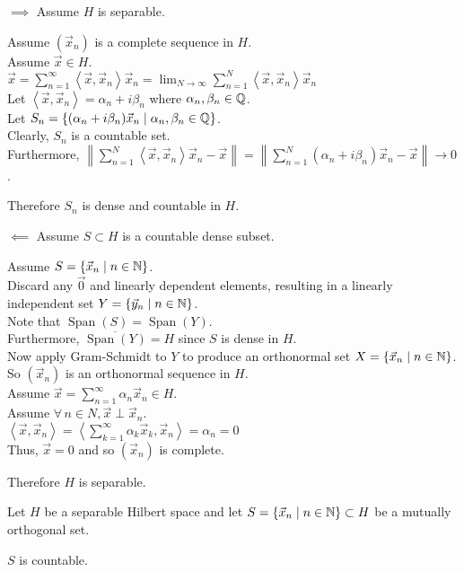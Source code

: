 \documentclass[letterpaper,12pt,fleqn]{article}
\newcommand{\vx}{\vec{x}}
\newcommand{\vy}{\vec{y}}
\newcommand{\vs}{\vec{x}}
\newcommand{\vo}{\vec{0}}
\newcommand{\norm}[1]{\left\|#1\right\|}
\newcommand{\inner}[1]{\left<#1\right>}
\renewcommand{\a}{\alpha}
\renewcommand{\b}{\beta}
\newcommand{\cl}[1]{\overline{#1}}
\DeclareMathOperator{\spn}{Span}
\begin{document}
\begin{theproof}
  \listbreak
  \begin{description}
  \item $\implies$ Assume $H$ is separable.

    Assume $(\vx_n)$ is a complete sequence in $H$. \\
    Assume $\vx\in H$. \\
    $\vx=\sum_{n=1}^{\infty}\inner{\vx,\vx_n}\vx_n=
    \lim_{N\to\infty}\sum_{n=1}^N\inner{\vx,\vx_n}\vx_n$ \\
    Let $\inner{\vx,\vx_n}=\a_n+i\b_n$ where $\a_n,\b_n\in\Q$. \\
    Let $S_n=\{(\a_n+i\b_n)\vx_n\mid\a_n,\b_n\in\Q\}$. \\
    Clearly, $S_n$ is a countable set. \\
    Furthermore, $\norm{\sum_{n=1}^N\inner{\vx,\vx_n}\vx_n-\vx}=
    \norm{\sum_{n=1}^N(\a_n+i\b_n)\vx_n-\vx}\to0$.

    Therefore $S_n$ is dense and countable in $H$.

  \item $\impliedby$ Assume $S\subset H$ is a countable dense subset.

    Assume $S=\{\vs_n\mid n\in\N\}$. \\
    Discard any $\vo$ and linearly dependent elements, resulting in a
    linearly independent set $Y=\{\vy_n\mid n\in\N\}$. \\
    Note that $\spn(S)=\spn(Y)$. \\
    Furthermore, $\cl{\spn(Y)}=H$ since $S$ is dense in $H$. \\
    Now apply Gram-Schmidt to $Y$ to produce an orthonormal set
    $X=\{\vx_n\mid n\in\N\}$. \\
    So $(\vx_n)$ is an orthonormal sequence in $H$. \\
    Assume $\vx=\sum_{n=1}^{\infty}\a_n\vx_n\in H$. \\
    Assume $\forall\,n\in N,\vx\perp\vx_n$. \\
    $\inner{\vx,\vx_n}=\inner{\sum_{k=1}^{\infty}\a_k\vx_k,\vx_n}=\a_n=0$ \\
    Thus, $\vx=0$ and so $(\vx_n)$ is complete.

    Therefore $H$ is separable.
  \end{description}
\end{theproof}

\begin{theorem}
  Let $H$ be a separable Hilbert space and let
  $S=\{\vx_n\mid n\in\N\}\subset H$ be a mutually orthogonal set.

  \qquad$S$ is countable.
\end{theorem}
\end{document}
